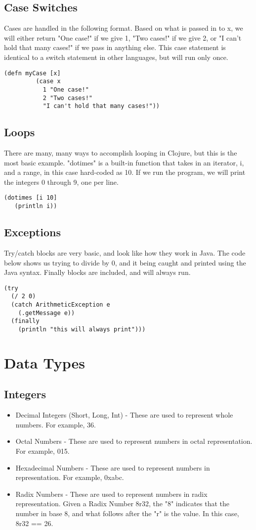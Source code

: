\documentclass{article}
\begin{document}
\subsection{Case Switches}
Cases are handled in the following format. Based on what is passed in to x, we will either return "One case!" if we give 1, "Two cases!" if we give 2, or "I can't hold that many cases!" if we pass in anything else. This case statement is identical to a switch statement in other languages, but will run only once.
\begin{lstlisting}
(defn myCase [x]
         (case x
           1 "One case!"
           2 "Two cases!"
           "I can't hold that many cases!"))
\end{lstlisting}

\subsection{Loops}
There are many, many ways to accomplish looping in Clojure, but this is the most basic example. "dotimes" is a built-in function that takes in an iterator, i, and a range, in this case hard-coded as 10. If we run the program, we will print the integers 0 through 9, one per line.
\begin{lstlisting}
(dotimes [i 10]
   (println i))
\end{lstlisting}

\subsection{Exceptions}
Try/catch blocks are very basic, and look like how they work in Java. The code below shows us trying to divide by 0, and it being caught and printed using the Java syntax. Finally blocks are included, and will always run.
\begin{lstlisting}
(try
  (/ 2 0)
  (catch ArithmeticException e
    (.getMessage e))
  (finally
    (println "this will always print")))
\end{lstlisting}


\section{Data Types}
\subsection{Integers}
\begin{itemize}
\item Decimal Integers (Short, Long, Int) - These are used to represent whole numbers. For example, 36.
\item Octal Numbers - These are used to represent numbers in octal representation. For example, 015.
\item Hexadecimal Numbers - These are used to represent numbers in representation. For example, 0xabc.
\item Radix Numbers - These are used to represent numbers in radix representation. Given a Radix Number 8r32, the "8" indicates that the number in base 8, and what follows after the "r" is the value. In this case, 8r32 == 26.
\end{itemize}
\end{document}
